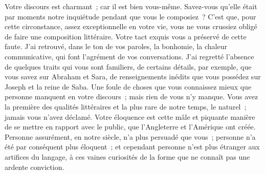\documentclass[french,twoside]{book} %
\newcommand\orgName[1]{#1}
\newcommand\persName[1]{#1}
\newcommand{\dateline}[1]{\medskip{\RaggedLeft{#1}\par}\bigskip}
\newcommand{\salute}[1]{\bigbreak{#1}\par\medbreak}
\begin{document}
\dateline{23 avril 1885}

\salute{Monsieur,}
\noindent Votre discours est charmant ; car il est bien vous-même. Savez-vous qu’elle était par moments notre inquiétude pendant que vous le composiez ? C’est que, pour cette circonstance, assez exceptionnelle en votre vie, vous ne vous crussiez obligé de faire une composition littéraire. Votre tact exquis vous a préservé de cette faute. J’ai retrouvé, dans le ton de vos paroles, la bonhomie, la chaleur communicative, qui font l’agrément de vos conversations. J’ai regretté l’absence de quelques traits qui vous sont familiers, de certains détails, par exemple, que vous savez sur {\persName Abraham} et {\persName Sara}, de renseignements inédits que vous possédez sur {\persName Joseph} et la {\persName reine de Saba}. Une foule de choses que vous connaissez mieux que personne manquent en votre discours ; mais rien de vous n’y manque. Vous avez la première des qualités littéraires et la plus rare de notre temps, le naturel ; jamais vous n’avez déclamé. Votre éloquence est cette mâle et piquante manière de se mettre en rapport avec le public, que l’{\orgName Angleterre} et l’{\orgName Amérique} ont créée. Personne assurément, en notre siècle, n’a plus persuadé que vous ; personne n’a été par conséquent plus éloquent ; et cependant personne n’est plus étranger aux artifices du langage, à ces vaines curiosités de la forme que ne connaît pas une ardente conviction.\par
\end{document}
